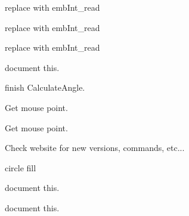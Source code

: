 \begin{DoxyRefList}
%
replace with emb\+Int\+\_\+read  
\item[Member \mbox{\hyperlink{formats_8c_a760e806c16c1612a6b5ca5a26bc736d1}{binary\+Write\+UShort}} (FILE $\ast$f, unsigned short data)]\label{todo__todo000406}%
%
replace with emb\+Int\+\_\+read  
\item[Member \mbox{\hyperlink{formats_8c_ac93ea02c7dfc79fb81e7e7cc5acea14a}{binary\+Write\+UShort\+BE}} (FILE $\ast$f, unsigned short data)]\label{todo__todo000407}%
%
replace with emb\+Int\+\_\+read  
\item[Member \mbox{\hyperlink{imgui__main_8c_ae14cb14b32162b75b166f20424ac698b}{button\+\_\+tip\+\_\+of\+\_\+the\+\_\+day\+\_\+clicked}} (int button)]\label{todo__todo000166}%
%
document this.  
\item[Member \mbox{\hyperlink{imgui__main_8c_a6d3433fd7ebb707563972aad2dbb0d54}{calculate\+\_\+angle}} (Emb\+Real x1, Emb\+Real y1, Emb\+Real x2, Emb\+Real y2)]\label{todo__todo000194}%
%
finish Calculate\+Angle.  
\item[Member \mbox{\hyperlink{imgui__main_8c_aa6ad3110116034fee8d590f7e379f7af}{calculate\+\_\+angle\+\_\+action}} (void)]\label{todo__todo000154}%
%
Get mouse point.  
\item[Member \mbox{\hyperlink{imgui__main_8c_a4111bee970d2262f92a8849ac1d2141d}{calculate\+\_\+distance\+\_\+action}} (void)]\label{todo__todo000155}%
%
Get mouse point.  
\item[Member \mbox{\hyperlink{imgui__main_8c_a66ef6ad8d060652b27ea3b6cee926756}{check\+For\+Updates}} (void)]\label{todo__todo000164}%
%
Check website for new versions, commands, etc...  
\item[Member \mbox{\hyperlink{imgui__main_8c_afddf9cfeda422b14ccd5d9f927288e9a}{circle\+\_\+action}} (void)]\label{todo__todo000105}%
%
circle fill  
\item[Member \mbox{\hyperlink{imgui__main_8c_afdedb6d22961c7bf7aec4f22a2287e98}{clear\+\_\+rubber}} (void)]\label{todo__todo000187}%
%
document this.  
\item[Member \mbox{\hyperlink{imgui__main_8c_af8c1680540296b4a2adacb15e57c295e}{clear\+Rubber\+Room}} (void)]\label{todo__todo000042}%
%
document this.  
\item[Member \mbox{\hyperlink{imgui__main_8c_a712db8de54d9461d1a106c9a7aac0d10}{close\+\_\+action}} (void)]\label{todo__todo000106}%

\end{DoxyRefList}
